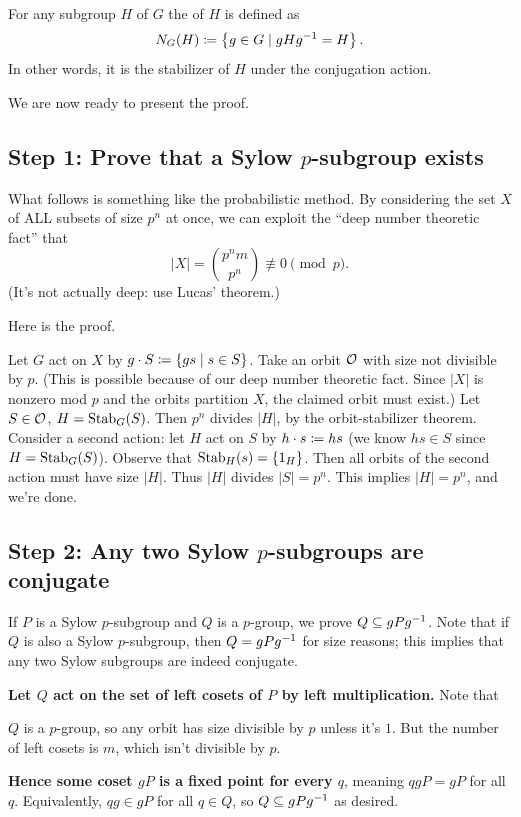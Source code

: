\begin{definition}
	For any subgroup $H$ of $G$ the  of $H$ is defined as
	\[ N_G(H) \coloneqq \left\{ g \in G \mid gHg^{-1} = H \right\}. \]
	In other words, it is the stabilizer of $H$ under the conjugation action.
\end{definition}

We are now ready to present the proof.

\subsection{Step 1: Prove that a Sylow $p$-subgroup exists}
What follows is something like the probabilistic method.
By considering the set $X$ of ALL subsets of size $p^n$ at once, we can exploit the ``deep number theoretic fact'' that
\[ \left\lvert X \right\rvert = \binom{p^n m}{p^n} \not\equiv 0 \pmod p. \]
(It's not actually deep: use Lucas' theorem.)

Here is the proof.
\begin{itemize}
	\ii Let $G$ act on $X$ by $g \cdot S \coloneqq \left\{ gs \mid s \in S \right\}$.
	\ii Take an orbit $\mathcal O$ with size not divisible by $p$.
	(This is possible because of our deep number theoretic fact.
	Since $\left\lvert X \right\rvert$ is nonzero mod $p$ and the orbits partition $X$,
	the claimed orbit must exist.)
	\ii Let $S \in \mathcal O$, $H = \operatorname{Stab}_G(S)$.
	Then $p^n$ divides $\left\lvert H \right\rvert$, by the orbit-stabilizer theorem.
	\ii Consider a second action: let $H$ act on $S$ by
	$h \cdot s \coloneqq hs$ (we know $hs \in S$ since $H = \operatorname{Stab}_G(S)$).
	\ii
	Observe that $\operatorname{Stab}_H(s) = \{1_H\}$.
	Then all orbits of the second action must have size $\left\lvert H \right\rvert$. Thus $\left\lvert H \right\rvert$ divides $\left\lvert S \right\rvert = p^n$.
	\ii This implies $\left\lvert H \right\rvert = p^n$, and we're done.
\end{itemize}


\subsection{Step 2: Any two Sylow $p$-subgroups are conjugate}
If $P$ is a Sylow $p$-subgroup and $Q$ is a $p$-group, we prove $Q
\subseteq gPg^{-1}$. Note that if $Q$ is also a Sylow $p$-subgroup, then
$Q = gPg^{-1}$ for size reasons; this implies that any two Sylow
subgroups are indeed conjugate.

\textbf{Let $Q$ act on the set of left cosets of $P$ by left multiplication.}
Note that
\begin{itemize}
	\ii $Q$ is a $p$-group, so any orbit has size divisible by $p$ unless it's $1$.
	\ii But the number of left cosets is $m$, which isn't divisible by $p$.
\end{itemize}
\textbf{Hence some coset $gP$ is a fixed point for every $q$}, meaning
$qgP = gP$ for all $q$.
Equivalently, $qg \in gP$ for all $q \in Q$, so $Q \subseteq gPg^{-1}$ as desired.


